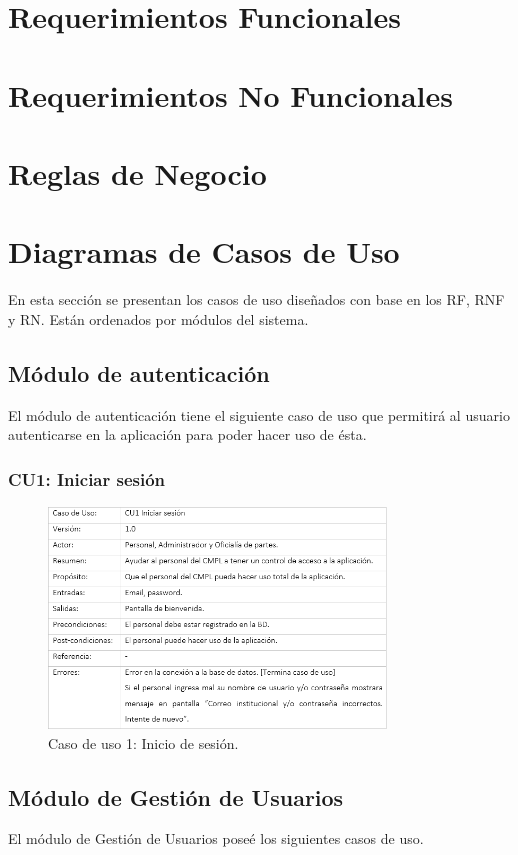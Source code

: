 \section{Requerimientos Funcionales}

\section{Requerimientos No Funcionales}

\section{Reglas de Negocio}

\section{Diagramas de Casos de Uso}
	En esta sección se presentan los casos de uso diseñados con base en los RF, RNF y RN. Están ordenados por módulos del sistema.
	\subsection{Módulo de autenticación}
	El módulo de autenticación tiene el siguiente caso de uso que permitirá al usuario autenticarse en la aplicación para poder hacer uso de ésta.
		\subsubsection{CU1: Iniciar sesión}
			\begin{figure}[htbp!]
				\centering
					\includegraphics[width=0.8\textwidth]{images/CU/CU1}
					\caption{Caso de uso 1: Inicio de sesión.}
				\label{Tabla}
			\end{figure}
	\subsection{Módulo de Gestión de Usuarios}
	El módulo de Gestión de Usuarios poseé los siguientes casos de uso.
	
